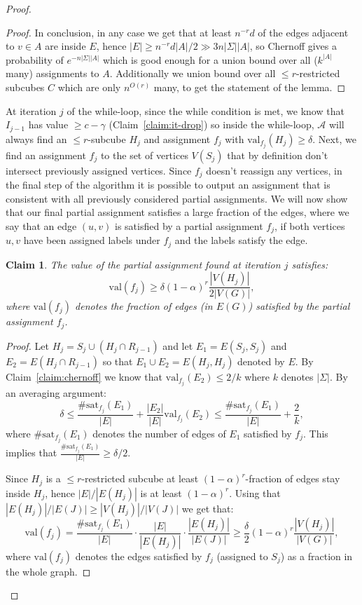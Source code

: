 \documentclass[11pt]{article}
\def \cA {\mathcal{A}}
\def \val {\mathrm{val}}
\newtheorem{claim}[theorem]{Claim}
\theoremstyle{definition}
\begin{document}
\begin{proof}
\begin{proof}
In conclusion, in any case we get that at least $n^{-r}d$ of the edges adjacent to $v \in A$ are inside $E$, hence $|E| \geq n^{-r} d |A|/2 \gg 3n|\Sigma| |A|$, so Chernoff gives a probability of $e^{-n|\Sigma| |A|}$ which is good enough for
a union bound over all ($k^{|A|}$ many) assignments to $A$. Additionally we union bound over all $\leq r$-restricted subcubes $C$ which are only $n^{O(r)}$ many, to get the statement of the lemma.
\end{proof}

At iteration $j$ of the while-loop, since the while condition is met, we know that $I_{j-1}$ has value $\geq c - \gamma$ (Claim~\ref{claim:it-drop}) so inside the while-loop, $\cA$ will always find an $\leq r$-subcube $H_j$ and assignment $f_j$ with $\val_{f_j}(H_j) \geq \delta$. Next, we find an assignment $f_j$ to the set of vertices $V(S_j)$ that by definition don't intersect previously assigned vertices. Since $f_j$ doesn't reassign any vertices, in the final step of the algorithm it is possible to output an assignment that is consistent with all previously considered partial assignments. We will now show that our final partial assignment satisfies a large fraction of the edges, where we say that an edge $(u,v)$ is satisfied by a partial assignment $f_j$, if both vertices $u,v$ have been assigned labels under $f_j$ and the labels satisfy the edge.


\begin{claim}\label{claim:it-val}
The value of the partial assignment found at iteration $j$ satisfies:
\[\val(f_j) \geq \delta(1 - \alpha)^r\frac{|V(H_j)|}{2|V(G)|},\]
where $\val(f_j)$ denotes the fraction of edges (in $E(G)$) satisfied by the partial assignment $f_j$.
\end{claim}

\begin{proof}
Let $H_j = S_j \cup (H_j \cap R_{j-1})$ and let $E_1 = E(S_j,S_j)$ and $E_2 = E(H_j \cap R_{j-1})$ so that $E_1 \cup E_2 = E(H_j,H_j)$ denoted by $E$. By Claim~\ref{claim:chernoff} we know that $\val_{f_j}(E_2) \leq 2/k$ where $k$ denotes $|\Sigma|$. 
By an averaging argument:
\[\delta \leq \frac{\#\text{sat}_{f_j}(E_1)}{|E|}+ \frac{|E_2|}{|E|}\val_{f_j}(E_2) \leq \frac{\#\text{sat}_{f_j}(E_1)}{|E|} + \frac{2}{k},\]
where $\#\text{sat}_{f_j}(E_1)$ denotes the number of edges of $E_1$ satisfied by $f_j$. This implies that $\frac{\#\text{sat}_{f_j}(E_1)}{|E|} \geq \delta/2$. 

Since $H_j$ is a $\leq r$-restricted subcube at least $(1-\alpha)^r$-fraction of edges stay inside $H_j$, hence $|E|/|E(H_j)|$ is at least $(1-\alpha)^r$. Using that $|E(H_j)|/|E(J)| \geq |V(H_j)|/|V(J)|$ we get that: 
\[\val(f_j) =  \frac{\#\text{sat}_{f_j}(E_1)}{|E|} \cdot \frac{|E|}{|E(H_j)|} \cdot \frac{|E(H_j)|}{|E(J)|} \geq \frac{\delta}{2}(1 - \alpha)^r\frac{|V(H_j)|}{|V(G)|},\]
where $\val(f_j)$ denotes the edges satisfied by $f_j$ (assigned to $S_j$) as a fraction in the whole graph. 
\end{proof}


\end{proof}
\end{document}
